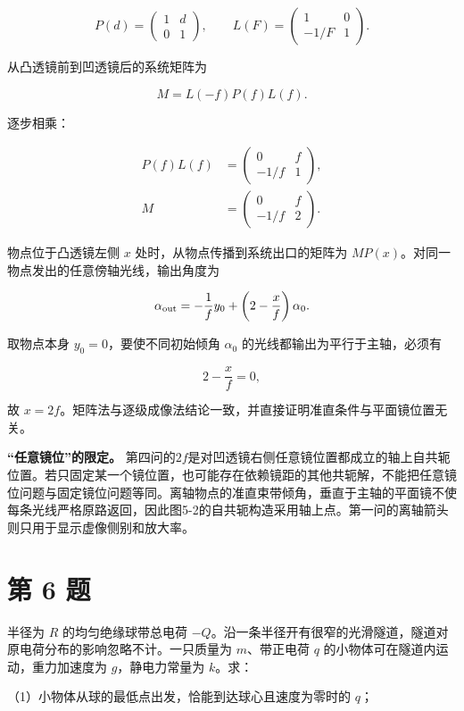 \documentclass[12pt,a4paper,UTF8]{ctexart}
\begin{document}
\[
P(d)=
\begin{pmatrix}1&d\\0&1\end{pmatrix},
\qquad
L(F)=
\begin{pmatrix}1&0\\-1/F&1\end{pmatrix}.
\]

从凸透镜前到凹透镜后的系统矩阵为

\[
M=L(-f)P(f)L(f).
\]

逐步相乘：

\[
\begin{aligned}
P(f)L(f)
&=
\begin{pmatrix}0&f\\-1/f&1\end{pmatrix},\\
M
&=
\begin{pmatrix}0&f\\-1/f&2\end{pmatrix}.
\end{aligned}
\]

物点位于凸透镜左侧 \(x\) 处时，从物点传播到系统出口的矩阵为
\(MP(x)\)。对同一物点发出的任意傍轴光线，输出角度为

\[
\alpha_{\rm out}
=-\frac1f y_0+\left(2-\frac xf\right)\alpha_0.
\]

取物点本身 \(y_0=0\)，要使不同初始倾角 \(\alpha_0\)
的光线都输出为平行于主轴，必须有

\[
2-\frac xf=0,
\]

故
\(x=2f\)。矩阵法与逐级成像法结论一致，并直接证明准直条件与平面镜位置无关。

\textbf{``任意镜位''的限定。}
第四问的\(2f\)是对凹透镜右侧任意镜位置都成立的轴上自共轭位置。若只固定某一个镜位置，也可能存在依赖镜距的其他共轭解，不能把任意镜位问题与固定镜位问题等同。离轴物点的准直束带倾角，垂直于主轴的平面镜不使每条光线严格原路返回，因此图5-2的自共轭构造采用轴上点。第一问的离轴箭头则只用于显示虚像侧别和放大率。

\newpage

\section{第 6 题}\label{ux7b2c-6-ux9898}

半径为 \(R\) 的均匀绝缘球带总电荷
\(-Q\)。沿一条半径开有很窄的光滑隧道，隧道对原电荷分布的影响忽略不计。一只质量为
\(m\)、带正电荷 \(q\) 的小物体可在隧道内运动，重力加速度为
\(g\)，静电力常量为 \(k\)。求：

（1）小物体从球的最低点出发，恰能到达球心且速度为零时的 \(q\)；
\end{document}
